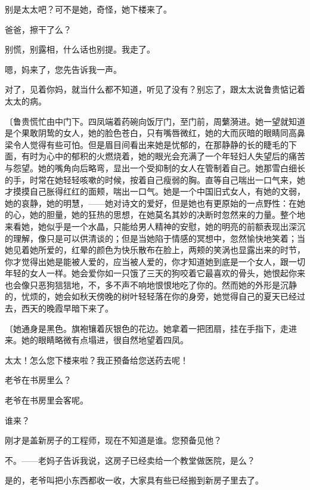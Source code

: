 别是太太吧？可不是她，奇怪，她下楼来了。

爸爸，擦干了么？

别慌，别露相，什么话也别提。我走了。

嗯，妈来了，您先告诉我一声。

对了，见着你妈，就当什么都不知道，听见了没有？别忘了，跟太太说鲁贵惦记着太太的病。

{\fangsong〔鲁贵慌忙由中门下。四凤端着药碗向饭厅门，至门前，周蘩漪进。她一望就知道是个果敢阴鸷的女人，她的脸色苍白，只有嘴唇微红，她的大而灰暗的眼睛同高鼻梁令人觉得有些可怕。但是眉目间看出来她是忧郁的，在那静静的长的睫毛的下面，有时为心中的郁积的火燃烧着，她的眼光会充满了一个年轻妇人失望后的痛苦与怨望。她的嘴角向后略弯，显出一个受抑制的女人在管制着自己。她那雪白细长的手，时常在她轻轻咳嗽的时候，按着自己瘦弱的胸。直等自己喘出一口气来，她才摸摸自己胀得红红的面颊，喘出一口气。她是一个中国旧式女人，有她的文弱，她的哀静，她的明慧，——她对诗文的爱好，但是她也有更原始的一点野性：在她的心，她的胆量，她的狂热的思想，在她莫名其妙的决断时忽然来的力量。整个地来看她，她似乎是一个水晶，只能给男人精神的安慰，她的明亮的前额表现出深沉的理解，像只是可以供清谈的；但是当她陷于情感的冥想中，忽然愉快地笑着；当她见着她所爱的，红晕的颜色为快乐散布在脸上，两颊的笑涡也显露出来的时节，你才觉得出她是能被人爱的，应当被人爱的，你才知道她到底是一个女人，跟一切年轻的女人一样。她会爱你如一只饿了三天的狗咬着它最喜欢的骨头，她恨起你来也会像只恶狗狺狺地，不，多不声不响地恨恨地吃了你的。然而她的外形是沉静的，忧烦的，她会如秋天傍晚的树叶轻轻落在你的身旁，她觉得自己的夏天已经过去，西天的晚霞早暗下来了。}

{\fangsong〔她通身是黑色。旗袍镶着灰银色的花边。她拿着一把团扇，挂在手指下，走进来。她的眼睛略微有点塌进，很自然地望着四凤。}

太太！怎么您下楼来啦？我正预备给您送药去呢！

老爷在书房里么？

老爷在书房里会客呢。

谁来？

刚才是盖新房子的工程师，现在不知道是谁。您预备见他？

不。——老妈子告诉我说，这房子已经卖给一个教堂做医院，是么？

是的，老爷叫把小东西都收一收，大家具有些已经搬到新房子里去了。

